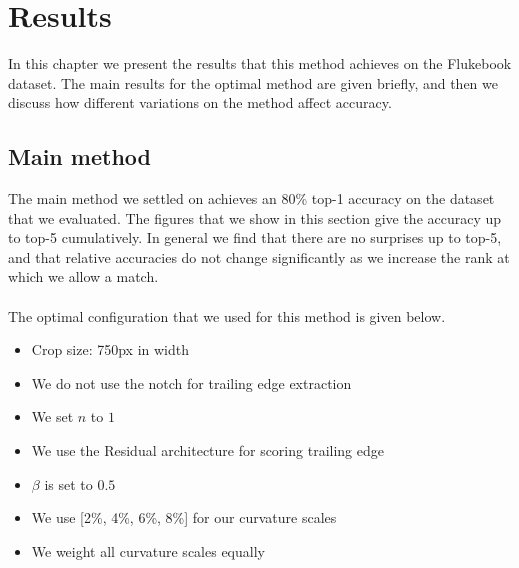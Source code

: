 

\chapter{Results} \label{sec:results}

In this chapter we present the results that this method achieves on the Flukebook dataset.
The main results for the optimal method are given briefly, and then we discuss how different variations on the method affect accuracy.

\section{Main method}

The main method we settled on achieves an 80\% top-1 accuracy on the dataset that we evaluated.  
The figures that we show in this section give the accuracy up to top-5 cumulatively.
In general we find that there are no surprises up to top-5, and that relative accuracies do not change significantly as we increase the rank at which we allow a match.
\\\\
The optimal configuration that we used for this method is given below.
\begin{itemize}
\item Crop size: 750px in width
\item We do not use the notch for trailing edge extraction
\item We set $n$ to $1$
\item We use the Residual architecture for scoring trailing edge
\item $\beta$ is set to $0.5$
\item We use [2\%, 4\%, 6\%, 8\%] for our curvature scales
\item We weight all curvature scales equally
\end{itemize}



